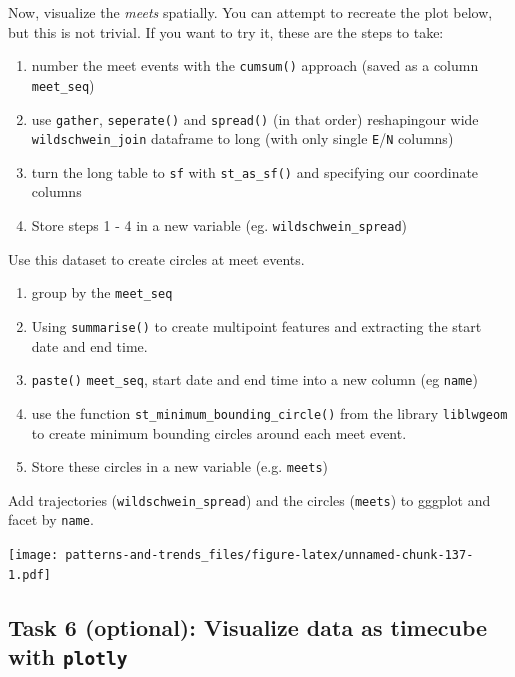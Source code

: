 \documentclass[]{book}
\providecommand{\tightlist}{%
  \setlength{\itemsep}{0pt}\setlength{\parskip}{0pt}}
\begin{document}
Now, visualize the \emph{meets} spatially. You can attempt to recreate the plot below, but this is not trivial. If you want to try it, these are the steps to take:

\begin{enumerate}
\def\labelenumi{\arabic{enumi}.}
\tightlist
\item
  number the meet events with the \texttt{cumsum()} approach (saved as a column \texttt{meet\_seq})
\item
  use \texttt{gather}, \texttt{seperate()} and \texttt{spread()} (in that order) reshapingour wide \texttt{wildschwein\_join} dataframe to long (with only single \texttt{E}/\texttt{N} columns)
\item
  turn the long table to \texttt{sf} with \texttt{st\_as\_sf()} and specifying our coordinate columns
\item
  Store steps 1 - 4 in a new variable (eg. \texttt{wildschwein\_spread})
\end{enumerate}

Use this dataset to create circles at meet events.

\begin{enumerate}
\def\labelenumi{\arabic{enumi}.}
\tightlist
\item
  group by the \texttt{meet\_seq}
\item
  Using \texttt{summarise()} to create multipoint features and extracting the start date and end time.
\item
  \texttt{paste()} \texttt{meet\_seq}, start date and end time into a new column (eg \texttt{name})
\item
  use the function \texttt{st\_minimum\_bounding\_circle()} from the library \texttt{liblwgeom} to create minimum bounding circles around each meet event.
\item
  Store these circles in a new variable (e.g. \texttt{meets})
\end{enumerate}

Add trajectories (\texttt{wildschwein\_spread}) and the circles (\texttt{meets}) to gggplot and facet by \texttt{name}.

\texttt{[image: patterns-and-trends\_files/figure-latex/unnamed-chunk-137-1.pdf]}

\hypertarget{task-6-optional-visualize-data-as-timecube-with-plotly}{%
\subsection{\texorpdfstring{Task 6 (optional): Visualize data as timecube with \texttt{plotly}}{Task 6 (optional): Visualize data as timecube with plotly}}\label{task-6-optional-visualize-data-as-timecube-with-plotly}}
\end{document}

